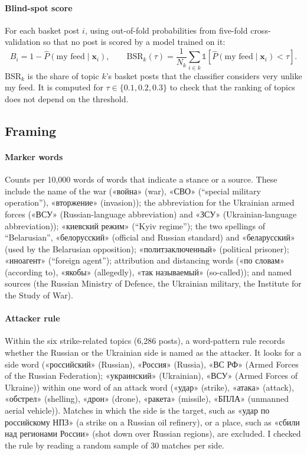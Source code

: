 \documentclass[11pt,a4paper]{article}
\newcommand{\ru}[2]{«#1» (#2)}
\begin{document}
\paragraph{Blind-spot score} For each basket post $i$, using out-of-fold probabilities from five-fold cross-validation so that no post is scored by a model trained on it:
\begin{equation}
B_i = 1 - \hat{P}(\text{my feed} \mid \mathbf{x}_i), \qquad
\mathrm{BSR}_k(\tau) = \frac{1}{N_k}\sum_{i\in k}\mathbb{1}\!\left[\hat{P}(\text{my feed}\mid \mathbf{x}_i) < \tau\right].
\end{equation}
$\mathrm{BSR}_k$ is the share of topic $k$'s basket posts that the classifier considers very unlike my feed. It is computed for $\tau\in\{0.1,0.2,0.3\}$ to check that the ranking of topics does not depend on the threshold.

\subsection{Framing}
\paragraph{Marker words} Counts per 10,000 words of words that indicate a stance or a source. These include the name of the war (\ru{война}{war}, \ru{СВО}{``special military operation''}, \ru{вторжение}{invasion}); the abbreviation for the Ukrainian armed forces (\ru{ВСУ}{Russian-language abbreviation} and \ru{ЗСУ}{Ukrainian-language abbreviation}); \ru{киевский режим}{``Kyiv regime''}; the two spellings of ``Belarusian'', «белорусский» (official and Russian standard) and «беларусский» (used by the Belarusian opposition); \ru{политзаключенный}{political prisoner}; \ru{иноагент}{``foreign agent''}; attribution and distancing words (\ru{по словам}{according to}, \ru{якобы}{allegedly}, \ru{так называемый}{so-called}); and named sources (the Russian Ministry of Defence, the Ukrainian military, the Institute for the Study of War).

\paragraph{Attacker rule} Within the six strike-related topics (6,286 posts), a word-pattern rule records whether the Russian or the Ukrainian side is named as the attacker. It looks for a side word (\ru{российский}{Russian}, \ru{Россия}{Russia}, \ru{ВС РФ}{Armed Forces of the Russian Federation}; \ru{украинский}{Ukrainian}, \ru{ВСУ}{Armed Forces of Ukraine}) within one word of an attack word (\ru{удар}{strike}, \ru{атака}{attack}, \ru{обстрел}{shelling}, \ru{дрон}{drone}, \ru{ракета}{missile}, \ru{БПЛА}{unmanned aerial vehicle}). Matches in which the side is the target, such as \ru{удар по российскому НПЗ}{a strike on a Russian oil refinery}, or a place, such as \ru{сбили над регионами России}{shot down over Russian regions}, are excluded. I checked the rule by reading a random sample of 30 matches per side.
\end{document}
